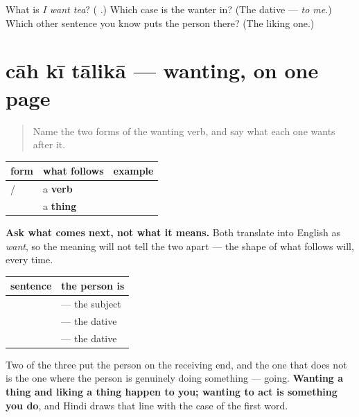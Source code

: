 \begin{tcolorbox}[breakable,colback=teal!4,colframe=teal!35!black,title={Before you move on}]
What is \emph{I want tea}? (\textbf{  }.) Which case is the wanter in? (The dative — \emph{to me}.) Which other sentence you know puts the person there? (The liking one.)
\end{tcolorbox}
\section[\texorpdfstring{\hi{चाह} \hi{की} \hi{तालिका} (cāh kī tālikā)}{चाह की तालिका (cāh kī tālikā)}]{cāh kī tālikā — wanting, on one page}

\label{lesson:HI-C95-repaso-chaah}



\begin{quote}
Name the two forms of the wanting verb, and say what each one wants after it.
\end{quote}

\begin{grammarlens}[title={Grammar Lens: one root, two forms}]
\noindent
\begin{tabularx}{\linewidth}{@{}>{\raggedright\arraybackslash}X>{\raggedright\arraybackslash}X>{\raggedright\arraybackslash}X@{}}
\toprule
\textbf{form} & \textbf{what follows} & \textbf{example} \\
\midrule
\hi{चाहता} / \hi{चाहती} & a \textbf{verb} & \hi{मैं} \hi{जाना} \hi{चाहता} \hi{हूँ} \\
\hi{चाहिए} & a \textbf{thing} & \hi{मुझे} \hi{चाय} \hi{चाहिए} \\
\bottomrule
\end{tabularx}

\textbf{Ask what comes next, not what it means.} Both translate into English as \emph{want}, so the meaning will not tell the two apart — the shape of what follows will, every time.
\end{grammarlens}

\begin{grammarlens}[title={Grammar Lens: who sits where}]
\noindent
\begin{tabularx}{\linewidth}{@{}>{\raggedright\arraybackslash}X>{\raggedright\arraybackslash}X@{}}
\toprule
\textbf{sentence} & \textbf{the person is} \\
\midrule
\hi{मैं} \hi{जाना} \hi{चाहता} \hi{हूँ} & \textbf{\hi{मैं}} — the subject \\
\hi{मुझे} \hi{चाय} \hi{चाहिए} & \textbf{\hi{मुझे}} — the dative \\
\hi{मुझे} \hi{चाय} \hi{पसंद} \hi{है} & \textbf{\hi{मुझे}} — the dative \\
\bottomrule
\end{tabularx}

Two of the three put the person on the receiving end, and the one that does not is the one where the person is genuinely doing something — going. \textbf{Wanting a thing and liking a thing happen to you; wanting to act is something you do}, and Hindi draws that line with the case of the first word.
\end{grammarlens}

